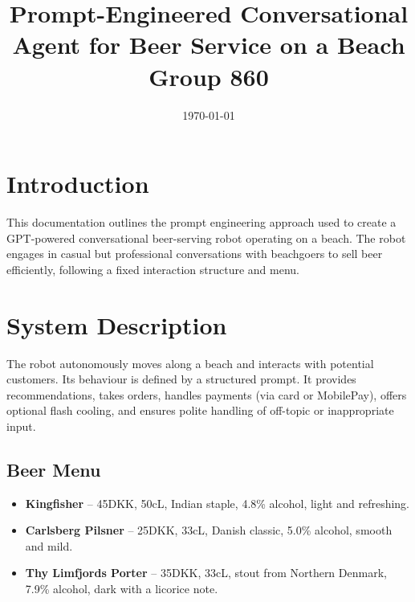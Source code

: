 \documentclass[11pt,a4paper]{article}
\title{Prompt-Engineered Conversational Agent for Beer Service on a Beach\\\large Group 860}
\date{\today}
\author{}
\begin{document}
\maketitle

\section{Introduction}
This documentation outlines the prompt engineering approach used to create a GPT-powered conversational beer-serving robot operating on a beach. The robot engages in casual but professional conversations with beachgoers to sell beer efficiently, following a fixed interaction structure and menu.

\section{System Description}
The robot autonomously moves along a beach and interacts with potential customers. Its behaviour is defined by a structured prompt. It provides recommendations, takes orders, handles payments (via card or MobilePay), offers optional flash cooling, and ensures polite handling of off-topic or inappropriate input.

\subsection*{Beer Menu}
\begin{itemize}[noitemsep]
  \item \textbf{Kingfisher} -- 45DKK, 50cL, Indian staple, 4.8\% alcohol, light and refreshing.
  \item \textbf{Carlsberg Pilsner} -- 25DKK, 33cL, Danish classic, 5.0\% alcohol, smooth and mild.
  \item \textbf{Thy Limfjords Porter} -- 35DKK, 33cL, stout from Northern Denmark, 7.9\% alcohol, dark with a licorice note.
\end{itemize}
\end{document}
